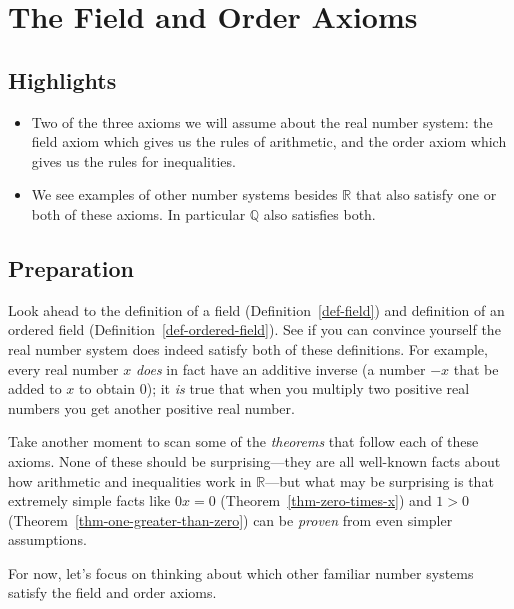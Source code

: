 \documentclass[
  letterpaper,
  DIV=11,
  numbers=noendperiod]{scrreprt}
\providecommand{\tightlist}{%
  \setlength{\itemsep}{0pt}\setlength{\parskip}{0pt}}
\def\R{\mathbb R}
\def\Q{\mathbb Q}
\theoremstyle{plain}
\theoremstyle{definition}
\theoremstyle{plain}
\theoremstyle{plain}
\theoremstyle{definition}
\theoremstyle{definition}
\theoremstyle{remark}
\begin{document}
\chapter{The Field and Order Axioms}\label{the-field-and-order-axioms}

\section{Highlights}\label{highlights}

\begin{itemize}
\tightlist
\item
  Two of the three axioms we will assume about the real number system:
  the field axiom which gives us the rules of arithmetic, and the order
  axiom which gives us the rules for inequalities.
\item
  We see examples of other number systems besides \(\R\) that also
  satisfy one or both of these axioms. In particular \(\Q\) also
  satisfies both.
\end{itemize}

\section{Preparation}\label{preparation}

Look ahead to the definition of a field (Definition~\ref{def-field}) and
definition of an ordered field (Definition~\ref{def-ordered-field}). See
if you can convince yourself the real number system does indeed satisfy
both of these definitions. For example, every real number \(x\)
\emph{does} in fact have an additive inverse (a number \(-x\) that be
added to \(x\) to obtain \(0\)); it \emph{is} true that when you
multiply two positive real numbers you get another positive real number.

Take another moment to scan some of the \emph{theorems} that follow each
of these axioms. None of these should be surprising---they are all
well-known facts about how arithmetic and inequalities work in
\(\R\)---but what may be surprising is that extremely simple facts like
\(0x=0\) (Theorem~\ref{thm-zero-times-x}) and \(1>0\)
(Theorem~\ref{thm-one-greater-than-zero}) can be \emph{proven} from even
simpler assumptions.

For now, let's focus on thinking about which other familiar number
systems satisfy the field and order axioms.
\end{document}
